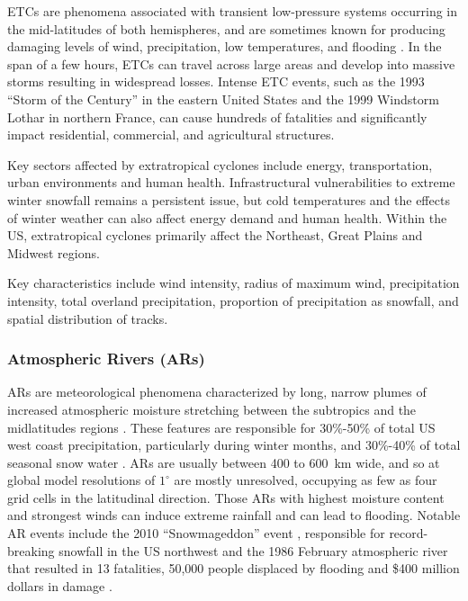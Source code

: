\documentclass[11pt]{article}
\newcommand\citep{\cite}
\begin{document}
ETCs are phenomena associated with transient low-pressure systems occurring in the mid-latitudes of both hemispheres, and are sometimes known for producing damaging levels of wind, precipitation, low temperatures, and flooding \citep{serreze1995climatological, ulbrich2009extra}. In the span of a few hours, ETCs can travel across large areas and develop into massive storms resulting in widespread losses. Intense ETC events, such as the 1993 ``Storm of the Century'' in the eastern United States and the 1999 Windstorm Lothar in northern France, can cause hundreds of fatalities and significantly impact residential, commercial, and agricultural structures.

Key sectors affected by extratropical cyclones include energy, transportation, urban environments and human health.  Infrastructural vulnerabilities to extreme winter snowfall remains a persistent issue, but  cold temperatures and the effects of winter weather can also affect energy demand and human health.  Within the US, extratropical cyclones primarily affect the Northeast, Great Plains and Midwest regions.

Key characteristics include wind intensity, radius of maximum wind, precipitation intensity, total overland precipitation, proportion of precipitation as snowfall, and spatial distribution of tracks.

\subsubsection*{Atmospheric Rivers (ARs)}

ARs are meteorological phenomena characterized by long, narrow plumes of increased atmospheric moisture stretching between the subtropics and the midlatitudes regions \citep{ralph2011storms}.  These features are responsible for 30\%-50\% of total US west coast precipitation, particularly during winter months, and 30\%-40\% of total seasonal snow water \citep{dettinger2011atmospheric, warner2012wintertime}.  ARs are usually between 400 to 600\ km wide, and so at global model resolutions of $1^\circ$ are mostly unresolved, occupying as few as four grid cells in the latitudinal direction.  Those ARs with highest moisture content and strongest winds can induce extreme rainfall and can lead to flooding.  Notable AR events include the 2010 ``Snowmageddon'' event \citep{halverson2010mega}, responsible for record-breaking snowfall in the US northwest and the 1986 February atmospheric river that resulted in 13 fatalities, 50,000 people displaced by flooding and \$400 million dollars in damage \citep{leung2009atmospheric}.
\end{document}
